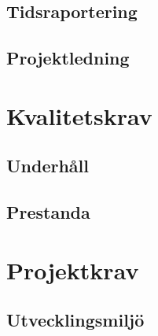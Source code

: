 \documentclass[a4paper]{article}
\begin{document}
\subsection{Tidsraportering}
\subsection{Projektledning}
\section{Kvalitetskrav}
\subsection{Underhåll}
\subsection{Prestanda}
\section{Projektkrav}
\subsection{Utvecklingsmiljö}
\end{document}
